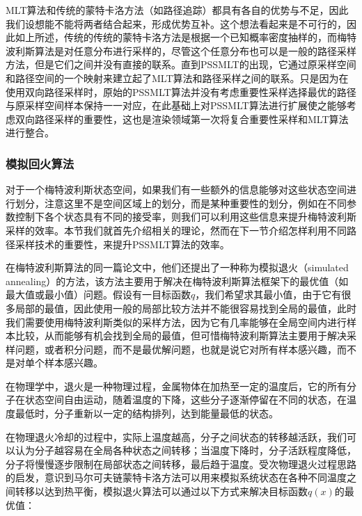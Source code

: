 MLT算法和传统的蒙特卡洛方法（如路径追踪）都具有各自的优势与不足，因此我们设想能不能将两者结合起来，形成优势互补。这个想法看起来是不可行的，因此如上所述，传统的传统的蒙特卡洛方法是根据一个已知概率密度抽样的，而梅特波利斯算法是对任意分布进行采样的，尽管这个任意分布也可以是一般的路径采样方法，但是它们之间并没有直接的联系。直到PSSMLT的出现，它通过原采样空间和路径空间的一个映射来建立起了MLT算法和路径采样之间的联系。只是因为在使用双向路径采样时，原始的PSSMLT算法并没有考虑重要性采样选择最优的路径与原采样空间样本保持一一对应，\cite{a:MultiplexedMetropolisLightTransport}在此基础上对PSSMLT算法进行扩展使之能够考虑双向路径采样的重要性，这也是渲染领域第一次将复合重要性采样和MLT算法进行整合。




\subsubsection{模拟回火算法}\label{sec:mlt-simulated-tempering}
对于一个梅特波利斯状态空间，如果我们有一些额外的信息能够对这些状态空间进行划分，注意这里不是空间区域上的划分，而是某种重要性的划分，例如在不同参数控制下各个状态具有不同的接受率，则我们可以利用这些信息来提升梅特波利斯采样的效率。本节我们就首先介绍相关的理论，然而在下一节介绍怎样利用不同路径采样技术的重要性，来提升PSSMLT算法的效率。

在梅特波利斯算法\cite{a:EquationofStateCalculationsbyFastComputingMachines}的同一篇论文中，他们还提出了一种称为模拟退火（simulated annealing）的方法，该方法主要用于解决在梅特波利斯算法框架下的最优值（如最大值或最小值）问题。假设有一目标函数$q$，我们希望求其最小值，由于它有很多局部的最值，因此使用一般的局部比较方法并不能很容易找到全局的最值，此时我们需要使用梅特波利斯类似的采样方法，因为它有几率能够在全局空间内进行样本比较，从而能够有机会找到全局的最值，但可惜梅特波利斯算法主要用于解决采样问题，或者积分问题，而不是最优解问题，也就是说它对所有样本感兴趣，而不是对单个样本感兴趣。

在物理学中，退火是一种物理过程，金属物体在加热至一定的温度后，它的所有分子在状态空间自由运动，随着温度的下降，这些分子逐渐停留在不同的状态，在温度最低时，分子重新以一定的结构排列，达到能量最低的状态。

在物理退火冷却的过程中，实际上温度越高，分子之间状态的转移越活跃，我们可以认为分子越容易在全局各种状态之间转移；当温度下降时，分子活跃程度降低，分子将慢慢逐步限制在局部状态之间转移，最后趋于温度。受次物理退火过程思路的启发，意识到马尔可夫链蒙特卡洛方法可以用来模拟系统状态在各种不同温度之间转移以达到热平衡，模拟退火算法可以通过以下方式来解决目标函数$q(x)$的最优值：

